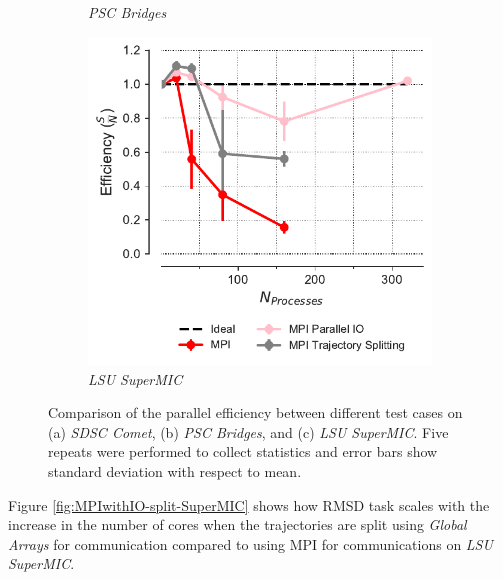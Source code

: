 \begin{figure}[!htb]
\begin{subfigure}{.35\textwidth}
    \caption{\emph{PSC Bridges}}
    \label{fig:comparison_efficiency_Bridges}
  \end{subfigure}
  \hfill
  \begin{subfigure}{.3\textwidth}
    \includegraphics[width=\linewidth]{figures/Comparison_Efficiency_all_SuperMIC.pdf}
    \caption{\emph{LSU SuperMIC}}
    \label{fig:comparison_efficiency_SuperMIC}
  \end{subfigure}
  \caption{Comparison of the parallel efficiency between different test cases on (a) \emph{SDSC Comet}, (b) \emph{PSC Bridges}, and (c) \emph{LSU SuperMIC}.
    Five repeats were performed to collect statistics and error bars show standard deviation with respect to mean.}
  \label{fig:comparison_efficiency_clusters}
\end{figure} 

Figure \ref{fig:MPIwithIO-split-SuperMIC} shows how RMSD task scales with the increase in the number of cores when the trajectories are split using \emph{Global Arrays} for communication compared to using MPI for communications on \emph{LSU SuperMIC}.  
 

